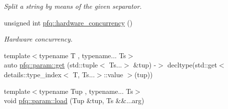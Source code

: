 \begin{DoxyCompactItemize}
\begin{DoxyCompactList}\small\item\em Split a string by means of the given separator. \end{DoxyCompactList}\item 
unsigned int \hyperlink{namespacepfq_a9a9e9be8b77976ed45483448f54de1f9}{pfq\+::hardware\+\_\+concurrency} ()
\begin{DoxyCompactList}\small\item\em Hardware concurrency. \end{DoxyCompactList}\item 
{\footnotesize template$<$typename T , typename... Ts$>$ }\\auto \hyperlink{namespacepfq_1_1param_a09da2abc1a228d7f77c35bed3bdb157d}{pfq\+::param\+::get} (std\+::tuple$<$ Ts...$>$ \&tup) -\/$>$ decltype(std\+::get$<$ details\+::type\+\_\+index$<$ T, Ts...$>$\+::value $>$(tup))
\item 
{\footnotesize template$<$typename Tup , typename... Ts$>$ }\\void \hyperlink{namespacepfq_1_1param_aeabbdcec021e01a0a9321678fea99d8f}{pfq\+::param\+::load} (Tup \&tup, Ts \&\&...arg)
\end{DoxyCompactItemize}
